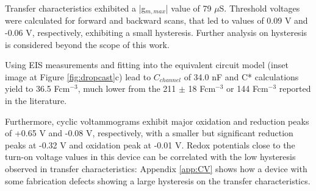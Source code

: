 Transfer characteristics exhibited a |g$_{m,max}$| value of 79 $\mu$S. Threshold voltages were calculated for forward and backward scans, that led to values of 0.09 V and -0.06 V, respectively, exhibiting a small hysteresis. Further analysis on hysteresis is considered beyond the scope of this work. 

Using EIS measurements and fitting into the equivalent circuit model (inset image at Figure \ref{fig:dropcast}c) lead to $C_{channel}$ of 34.0 nF and C* calculations yield to 36.5 Fcm$^{-3}$, much lower from the 211 $\pm$ 18 Fcm$^{-3}$ \cite{moserEthyleneGlycolBasedSide2020} or 144 Fcm$^{-3}$ \cite{hidalgocastilloSimultaneousPerformanceStability2022a} reported in the literature. 

Furthermore, cyclic voltammograms exhibit major oxidation and reduction peaks of +0.65 V and -0.08 V, respectively, with a smaller but significant reduction peaks at -0.32 V and oxidation peak at -0.01 V. Redox potentials close to the turn-on voltage values in this device can be correlated with the low hysteresis observed in transfer characteristics: Appendix \ref{app:CV} shows how a device with some fabrication defects showing a large hysteresis on the transfer characteristics. 


